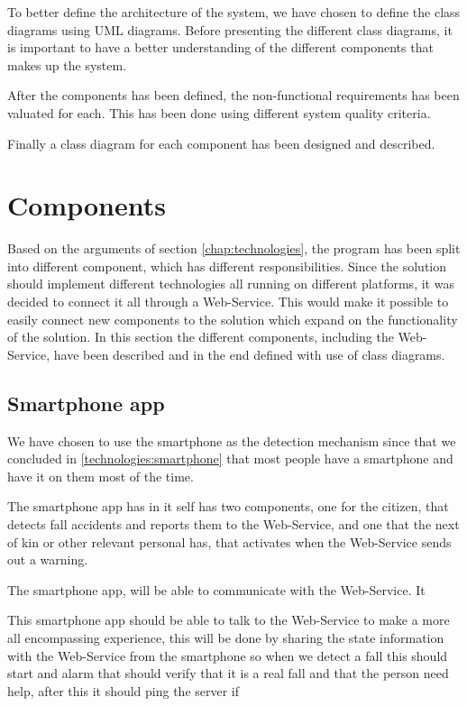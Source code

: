 To better define the architecture of the system, we have chosen to define the class diagrams using UML diagrams. Before presenting the different class diagrams, it is important to have a better understanding of the different components that makes up the system. 

After the components has been defined, the non-functional requirements has been valuated for each. This has been done using different system quality criteria.

Finally a class diagram for each component has been designed and described.

\section{Components}
Based on the arguments of section \ref{chap:technologies}, the program has been split into different component, which has different responsibilities. Since the solution should implement different technologies all running on different platforms, it was decided to connect it all through a Web-Service. This would make it possible to easily connect new components to the solution which expand on the functionality of the solution. In this section the different components, including the Web-Service, have been described and in the end defined with use of class diagrams.

\subsection{Smartphone app}
We have chosen to use the smartphone as the detection mechanism since that we concluded in \ref{technologies:smartphone} that most people have a smartphone and have it on them most of the time. 

The smartphone app has in it self has two components, one for the citizen, that detects fall accidents and reports them to the Web-Service, and one that the next of kin or other relevant personal has, that activates when the Web-Service sends out a warning.

The smartphone app, will be able to communicate with the Web-Service. It 

This smartphone app should be able to talk to the Web-Service to make a more all encompassing experience, this will be done by sharing the state information with the Web-Service from the smartphone so when we detect a fall this should start and alarm that should verify that it is a real fall and that the person need help, after this it should ping the server if 

